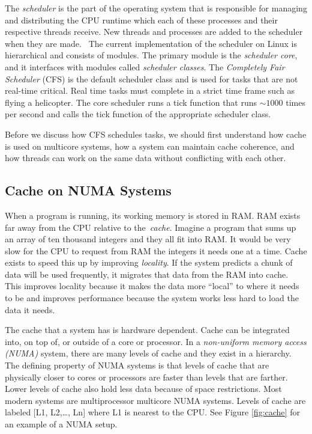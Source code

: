 \documentclass{sig-alternate}
\begin{document}
The \emph{scheduler} is the part of the operating system that is responsible for managing and distributing the CPU runtime which each of these processes and their respective threads receive. New threads and processes are added to the scheduler when they are made.~\cite{Lozi:2016} The current implementation of the scheduler on Linux is hierarchical and consists of modules. The primary module is the \emph{scheduler core}, and it interfaces with modules called \emph{scheduler classes}. The \emph{Completely Fair Scheduler} (CFS) is the default scheduler class and is used for tasks that are not real-time critical. Real time tasks must complete in a strict time frame such as flying a helicopter. The core scheduler runs a tick function that runs ${\sim}1000$ times per second and calls the tick function of the appropriate scheduler class. 

Before we discuss how CFS schedules tasks, we should first understand how cache is used on multicore systems, how a system can maintain cache coherence, and how threads can work on the same data without conflicting with each other.

\pagebreak 

\subsection{Cache on NUMA Systems}
\label{sec:cache}

When a program is running, its working memory is stored in RAM. RAM exists far away from the CPU relative to the~\emph{cache}. Imagine a program that sums up an array of ten thousand integers and they all fit into RAM. It would be very slow for the CPU to request from RAM the  integers it needs one at a time. Cache exists to speed this up by improving \emph{locality}. If the system predicts a chunk of data will be used frequently, it migrates that data from the RAM into cache. This improves locality because it makes the data more ``local'' to where it needs to be and improves performance because the system works less hard to load the data it needs.

The cache that a system has is hardware dependent. Cache can be integrated into, on top of, or outside of a core or processor. In a \emph{non-uniform memory access (NUMA)} system, there are many levels of cache and they exist in a hierarchy. The defining property of NUMA systems is that levels of cache that are physically closer to cores or processors are faster than levels that are farther. Lower levels of cache also hold less data because of space restrictions. Most modern systems are multiprocessor multicore NUMA systems. Levels of cache are labeled [L1, L2,\dots, Ln] where L1 is nearest to the CPU. See Figure \ref{fig:cache} for an example of a NUMA setup.
\end{document}
